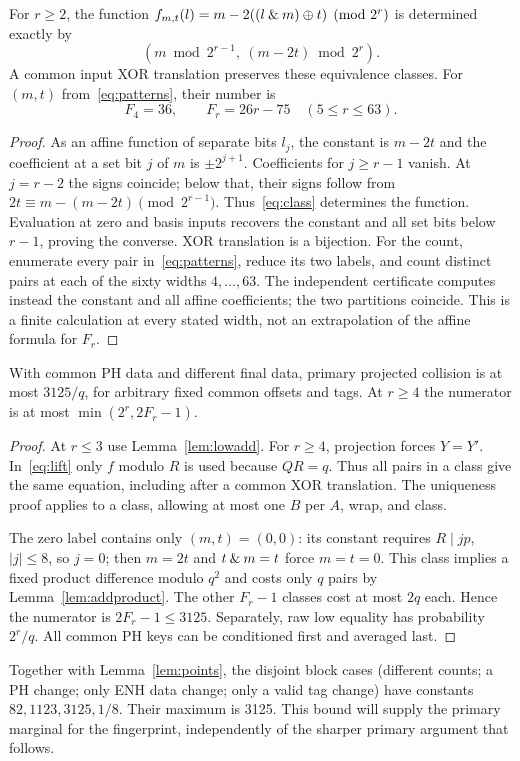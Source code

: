 \begin{lemma}\label{lem:classes}
For $r\ge2$, the function
$f_{m,t}(l)=m-2((l\mathbin{\&} m)\mathbin\oplus t)\pmod{2^r}$ is determined exactly by
\begin{equation}\label{eq:class}
 (m\bmod2^{r-1},\ (m-2t)\bmod2^r).
\end{equation}
A common input XOR translation preserves these equivalence classes. For $(m,t)$ from~\eqref{eq:patterns}, their number is
\[
 F_4=36,\qquad F_r=26r-75\quad(5\le r\le63).
\]
\end{lemma}
\begin{proof}
As an affine function of separate bits $l_j$, the constant is $m-2t$ and the coefficient at a set bit $j$ of $m$ is $\pm2^{j+1}$. Coefficients for $j\ge r-1$ vanish. At $j=r-2$ the signs coincide; below that, their signs follow from $2t\equiv m-(m-2t)\pmod{2^{r-1}}$. Thus~\eqref{eq:class} determines the function. Evaluation at zero and basis inputs recovers the constant and all set bits below $r-1$, proving the converse. XOR translation is a bijection. For the count, enumerate every pair in~\eqref{eq:patterns}, reduce its two labels, and count distinct pairs at each of the sixty widths $4,\ldots,63$. The independent certificate computes instead the constant and all affine coefficients; the two partitions coincide. This is a finite calculation at every stated width, not an extrapolation of the affine formula for $F_r$.
\end{proof}

\begin{theorem}\label{thm:3125}
With common PH data and different final data, primary projected collision is at most $3125/q$, for arbitrary fixed common offsets and tags. At $r\ge4$ the numerator is at most $\min(2^r,2F_r-1)$.
\end{theorem}
\begin{proof}
At $r\le3$ use Lemma~\ref{lem:lowadd}. For $r\ge4$, projection forces $Y=Y'$. In~\eqref{eq:lift} only $f$ modulo $R$ is used because $QR=q$. Thus all pairs in a class give the same equation, including after a common XOR translation. The uniqueness proof applies to a class, allowing at most one $B$ per $A$, wrap, and class.

The zero label contains only $(m,t)=(0,0)$: its constant requires $R\mid jp$, $|j|\le8$, so $j=0$; then $m=2t$ and $t\mathbin{\&} m=t$ force $m=t=0$. This class implies a fixed product difference modulo $q^2$ and costs only $q$ pairs by Lemma~\ref{lem:addproduct}. The other $F_r-1$ classes cost at most $2q$ each. Hence the numerator is $2F_r-1\le3125$. Separately, raw low equality has probability $2^r/q$. All common PH keys can be conditioned first and averaged last.
\end{proof}
Together with Lemma~\ref{lem:points}, the disjoint block cases (different counts; a PH change; only ENH data change; only a valid tag change) have constants $82,1123,3125,1/8$. Their maximum is 3125. This bound will supply the primary marginal for the fingerprint, independently of the sharper primary argument that follows.

